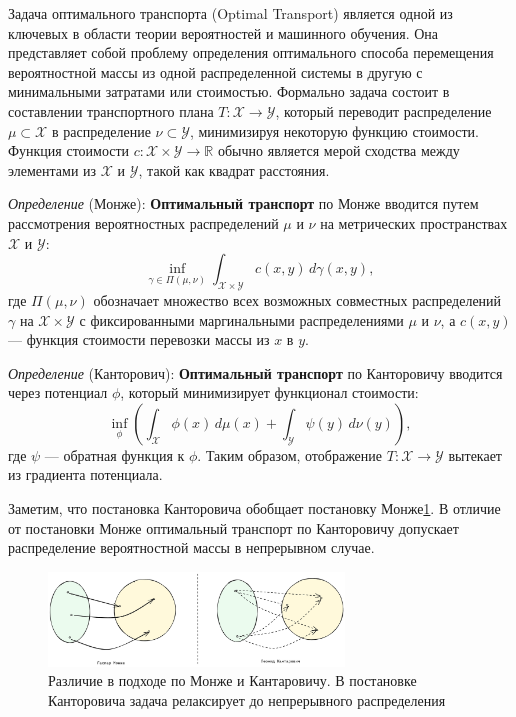 Задача оптимального транспорта (Optimal Transport)\cite{villani2009optimal} является одной из ключевых  
в области теории вероятностей и машинного обучения.
Она представляет собой проблему определения оптимального способа перемещения вероятностной массы из одной 
распределенной системы в другую с минимальными затратами или стоимостью. Формально задача состоит в составлении 
транспортного плана \( T: \mathcal{X} \rightarrow \mathcal{Y} \), 
который переводит распределение \( \mu \subset \mathcal{X}\) в распределение \( \nu \subset \mathcal{Y} \), минимизируя некоторую функцию стоимости. 
Функция стоимости $c: \mathcal{X} \times \mathcal{Y} \rightarrow \mathbb{R}$ обычно является мерой сходства между элементами из \( \mathcal{X} \) и \( \mathcal{Y} \), 
такой как квадрат расстояния. 

\textit{Определение} (Монже): \textbf{Оптимальный транспорт} по Монже вводится путем рассмотрения вероятностных 
распределений \( \mu \) и \( \nu \) на метрических пространствах \( \mathcal{X} \) и \( \mathcal{Y} \):
\begin{equation}
    \inf_{\gamma \in \Pi(\mu, \nu)} \int_{\mathcal{X} \times \mathcal{Y}} c(x,y) \, d\gamma(x,y),
\end{equation}
где \( \Pi(\mu, \nu) \) обозначает множество всех возможных совместных распределений 
\( \gamma \) на \( \mathcal{X} \times \mathcal{Y} \) с фиксированными маргинальными
распределениями \( \mu \) и \( \nu \), а \( c(x,y) \) — функция стоимости перевозки массы из \( x \) в \( y \).

\textit{Определение} (Канторович): \textbf{Оптимальный транспорт} по Канторовичу  вводится через потенциал $\phi$, 
который минимизирует функционал стоимости:
\begin{equation}
    \inf_{\phi} \left( \int_{\mathcal{X}} \phi(x) \, d\mu(x) + \int_{\mathcal{Y}} \psi(y) \, d\nu(y) \right),
\end{equation}
где \( \psi \) — обратная функция к \( \phi \). Таким образом, 
отображение \( T: \mathcal{X} \rightarrow \mathcal{Y} \) вытекает из градиента потенциала.

Заметим, что постановка Канторовича обобщает постановку Монже\ref{monge_vs_kantarovich}. В отличие от постановки Монже 
оптимальный транспорт по Канторовичу допускает распределение вероятностной массы в непрерывном случае.

\begin{figure}[h]
    \centering
    \includegraphics[width=0.7\textwidth]{assets/math/transport/optimal_transport.excalidraw.png}
    \caption{Различие в подходе по Монже и Кантаровичу. В постановке Канторовича задача релаксирует до 
    непрерывного распределения}
    \label{monge_vs_kantarovich}
\end{figure}

